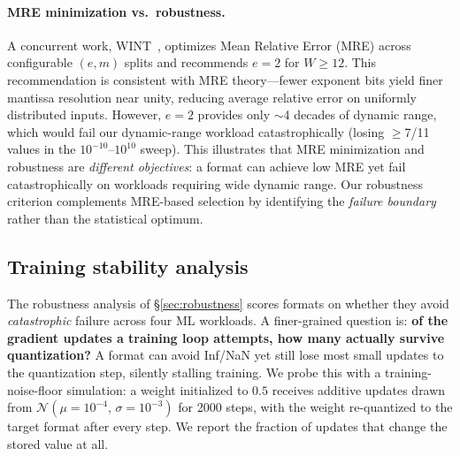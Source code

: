 \documentclass[11pt]{article}
\begin{document}
\paragraph{MRE minimization vs.\ robustness.}
A concurrent work, WINT~\cite{lee2026wint}, optimizes Mean Relative Error
(MRE) across configurable $(e, m)$ splits and recommends $e{=}2$ for
$W \geq 12$. This recommendation is consistent with MRE theory---fewer
exponent bits yield finer mantissa resolution near unity, reducing average
relative error on uniformly distributed inputs. However, $e{=}2$ provides
only $\sim$4 decades of dynamic range, which would fail our dynamic-range
workload catastrophically (losing $\geq$7/11 values in the
$10^{-10}$--$10^{10}$ sweep). This illustrates that MRE minimization and
robustness are \emph{different objectives}: a format can achieve low MRE
yet fail catastrophically on workloads requiring wide dynamic range. Our
robustness criterion complements MRE-based selection by identifying the
\emph{failure boundary} rather than the statistical optimum.

\subsection{Training stability analysis}\label{sec:training}

The robustness analysis of \S\ref{sec:robustness} scores formats on whether they
avoid \emph{catastrophic} failure across four ML workloads. A finer-grained
question is: \textbf{of the gradient updates a training loop attempts, how many
actually survive quantization?} A format can avoid Inf/NaN yet still lose most
small updates to the quantization step, silently stalling training. We probe
this with a training-noise-floor simulation: a weight initialized to $0.5$
receives additive updates drawn from $\mathcal{N}(\mu{=}10^{-4},\,\sigma{=}10^{-3})$
for 2000 steps, with the weight re-quantized to the target format after every
step. We report the fraction of updates that change the stored value at all.
\end{document}
